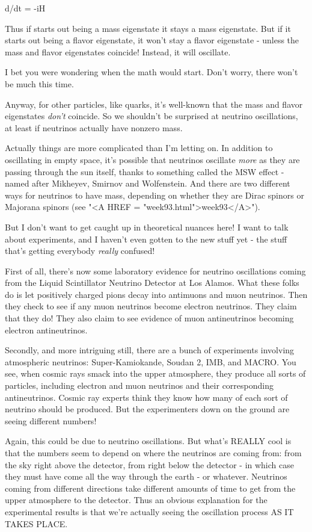                        d\psi /dt = -iH \psi 

Thus if \psi  starts out being a mass eigenstate it stays a mass eigenstate.
But if it starts out being a flavor eigenstate, it won't stay a flavor 
eigenstate - unless the mass and flavor eigenstates coincide!  Instead, it
will oscillate.

I bet you were wondering when the math would start.   Don't worry, there
won't be much this time.

Anyway, for other particles, like quarks, it's well-known that the mass
and flavor eigenstates \emph{don't} coincide.  So we shouldn't be surprised
at neutrino oscillations, at least if neutrinos actually have nonzero
mass.  

Actually things are more complicated than I'm letting on.  In addition
to oscillating in empty space, it's possible that neutrinos oscillate
\emph{more} as they are passing through the sun itself, thanks to something
called the MSW effect - named after Mikheyev, Smirnov and Wolfenstein.
And there are two different ways for neutrinos to have mass, depending
on whether they are Dirac spinors or Majorana spinors 
(see "<A HREF = "week93.html">week93</A>").

But I don't want to get caught up in theoretical nuances here!  I want
to talk about experiments, and I haven't even gotten to the new stuff
yet - the stuff that's getting everybody \emph{really} confused!

First of all, there's now some laboratory evidence for neutrino 
oscillations coming from the Liquid Scintillator Neutrino Detector at
Los Alamos.  What these folks do is let positively charged pions decay
into antimuons and muon neutrinos.  Then they check to see if any muon
neutrinos become electron neutrinos.   They claim that they do!  They
also claim to see evidence of muon antineutrinos becoming electron
antineutrinos.

Secondly, and more intriguing still, there are a bunch of experiments
involving atmospheric neutrinos: Super-Kamiokande, Soudan 2, IMB, and 
MACRO.   You see, when cosmic rays smack into the upper atmosphere, they
produce all sorts of particles, including electron and muon neutrinos
and their corresponding antineutrinos.  Cosmic ray experts think they
know how many of each sort of neutrino should be produced.  But the
experimenters down on the ground are seeing different numbers!  

Again, this could be due to neutrino oscillations.  But what's REALLY
cool is that the numbers seem to depend on where the neutrinos are
coming from: from the sky right above the detector, from right below the
detector - in which case they must have come all the way through the
earth - or whatever.  Neutrinos coming from different directions take
different amounts of time to get from the upper atmosphere to the
detector.  Thus an obvious explanation for the experimental results is
that we're actually seeing the oscillation process AS IT TAKES PLACE.

